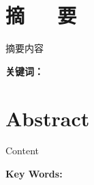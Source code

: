 \chapter*{摘~~~要}

摘要内容

\vspace{1\ccwd}

\textbf{关键词：}

\chapter*{\textbf{Abstract}}

Content

\vspace{1\ccwd}

\textbf{Key Words: }

